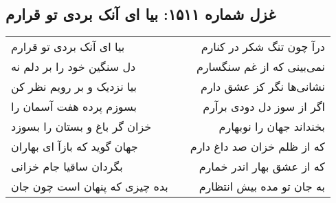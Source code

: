 \begin{center}
\section*{غزل شماره ۱۵۱۱: بیا ای آنک بردی تو قرارم}
\label{sec:1511}
\begin{longtable}{l p{0.5cm} r}
بیا ای آنک بردی تو قرارم
&&
درآ چون تنگ شکر در کنارم
\\
دل سنگین خود را بر دلم نه
&&
نمی‌بینی که از غم سنگسارم
\\
بیا نزدیک و بر رویم نظر کن
&&
نشانی‌ها نگر کز عشق دارم
\\
بسوزم پرده هفت آسمان را
&&
اگر از سوز دل دودی برآرم
\\
خزان گر باغ و بستان را بسوزد
&&
بخنداند جهان را نوبهارم
\\
جهان گوید که بازآ ای بهاران
&&
که از ظلم خزان صد داغ دارم
\\
بگردان ساقیا جام خزانی
&&
که از عشق بهار اندر خمارم
\\
بده چیزی که پنهان است چون جان
&&
به جان تو مده بیش انتظارم
\\
\end{longtable}
\end{center}
